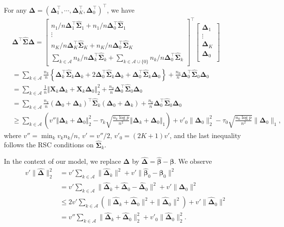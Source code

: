 \documentclass[twoside,12pt]{article}
\newcommand{\mb}[1]{\boldsymbol{\mathbf{#1}}}
\newcommand{\wh}[1]{\widehat{#1}}
\begin{document}
For any $\mb\Delta=(\mb\Delta_1^\top,\cdots,\mb\Delta_K^\top,\mb\Delta_0^\top)^\top$, we have
\begin{equation*}
	\begin{aligned}
		&\mb\Delta^\top\wh{\mb\Sigma}\mb\Delta=\begin{bmatrix}
			n_1/n\mb\Delta_1^\top\wh{\mb\Sigma}_1+n_1/n\mb\Delta_0^\top\wh{\mb\Sigma}_1\\
			\vdots\\
			n_K/n\mb\Delta_K^\top\wh{\mb\Sigma}_K+n_K/n\mb\Delta_0^\top\wh{\mb\Sigma}_K\\
			\sum_{k\in\mathcal{A}} n_k/n\mb\Delta_k^\top\wh{\mb\Sigma}_k+\sum_{k\in\mathcal{A}\cup\{0\}} n_k/n\mb\Delta_0^\top\wh{\mb\Sigma}_k
		\end{bmatrix}^\top
		\begin{bmatrix}
			\mb\Delta_1\\
			\vdots\\
			\mb\Delta_K\\
			\mb\Delta_0\\
		\end{bmatrix}\\
		&=\sum_{k\in\mathcal{A}}\frac{n_k}n\left\{  \mb\Delta_k^\top\wh{\mb\Sigma}_k\mb\Delta_k+2\mb\Delta_0^\top\wh{\mb\Sigma}_k\mb\Delta_k+\mb\Delta_0^\top\wh{\mb\Sigma}_k\mb\Delta_0 \right\}+\frac{n_0}n \mb\Delta_0^\top\wh{\mb\Sigma}_0\mb\Delta_0\\
		&=\sum_{k\in\mathcal{A}}\frac{1}n \left\Vert\mb X_k\mb\Delta_k+\mb X_k\mb\Delta_0\right\Vert_2^2+\frac{n_0}n \mb\Delta_0^\top\wh{\mb\Sigma}_0\mb\Delta_0\\
		&= \sum_{k\in\mathcal{A}}\frac{n_k}n \left(\mb\Delta_0+\mb\Delta_k\right)^\top\wh{\mb\Sigma}_k\left(\mb\Delta_0+\mb\Delta_k\right)+\frac{n_0}n \mb\Delta_0^\top\wh{\mb\Sigma}_0\mb\Delta_0\\
		&\geq \sum_{k\in\mathcal A} \left(v''\left\Vert\mb\Delta_k+\mb\Delta_0\right\Vert_2^2-\tau_k\sqrt{\frac{n_k\log p}{n^2}}\left\Vert\mb\Delta_k+\mb\Delta_0\right\Vert_1\right)+v'_0\|\mb\Delta_0\|_2^2-\tau_0 \sqrt{\frac{n_0\log p}{n^2}}\|\mb\Delta_0\|_1,
	\end{aligned}
\end{equation*}
where $v''=\min_k v_k n_k/n$, $v'=v''/2$, $v'_0=(2K+1)v'$, and the last inequality follows the RSC conditions on $\wh{\mb\Sigma}_k$.

In the context of our model, we replace $\mb\Delta$ by $\wh{\mb\Delta}=\wh{\mb\beta}-\mb\beta$. 
We observe
\begin{equation}
	\label{eq: l1p1}
	\begin{aligned}
		v'\|\wh{\mb\Delta}\|_2^2&=v'\sum_{k\in\mathcal A}\|\wh{\mb\Delta}_k\|^2+v'\|\wh{\mb\beta}_0-\mb\beta_0\|^2\\
		&= v'\sum_{k\in\mathcal A}\|\wh{\mb\Delta}_k+\wh{\mb\Delta}_0-\wh{\mb\Delta}_0\|^2+v'\|\wh{\mb\Delta}_0\|^2\\
&\leq 2v'\sum_{k\in\mathcal A}\left(\|\wh{\mb\Delta}_k+\wh{\mb\Delta}_0\|^2+\|\wh{\mb\Delta}_0\|^2\right)+v'\|\wh{\mb\Delta}_0\|^2\\
		&= v''\sum_{k\in\mathcal A} \|\wh{\mb\Delta}_k+\wh{\mb\Delta}_0\|_2^2+v'_0\|\wh{\mb\Delta}_0\|_2^2.
	\end{aligned}
\end{equation}
\end{document}
